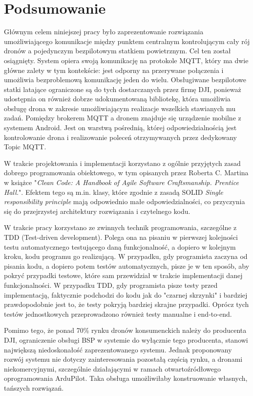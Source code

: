 \clearpage \section*{Podsumowanie} 

Głównym celem niniejszej pracy było zaprezentowanie rozwiązania umożliwiającego komunikacje między punktem centralnym kontrolującym cały rój dronów a pojedynczym bezpilotowym statkiem powietrznym. Cel ten został osiągnięty. System opiera swoją komunikację na protokole MQTT, który ma dwie główne zalety w tym kontekście: jest odporny na przerywane połączenia i umożliwia bezproblemową komunikację jeden do wielu. Obsługiwane bezpilotowe statki latające ograniczone są do tych dostarczanych przez firmę DJI, ponieważ udostępnia on również dobrze udokumentowaną bibliotekę, która umożliwia obsługę drona w zakresie umożliwiającym realizacje wszelkich stawianych mu zadań. Pomiędzy brokerem MQTT a dronem znajduje się urządzenie mobilne z systemem Android. Jest on warstwą pośrednią, której odpowiedzialnością jest kontrolowanie drona i realizowanie poleceń otrzymywanych przez dedykowany Topic MQTT.

W trakcie projektowania i implementacji korzystano z ogólnie przyjętych zasad dobrego programowania obiektowego, w tym opisanych przez Roberta C. Martina w książce "\textit{Clean Code: A Handbook of Agile Software Craftsmanship. Prentice Hall.}". Efektem tego są m.in. klasy, które zgodnie z zasadą SOLID \textit{Single responsibility principle} mają odpowiednio małe odpowiedzialności, co przyczynia się do przejrzystej architektury rozwiązania i czytelnego kodu. \cite{solid}\cite{clean-code}

W trakcie pracy korzystano ze zwinnych technik programowania, szczególne z TDD (Test-driven development). Polega ona na pisaniu w pierwszej kolejności testu automatycznego testującego daną funkcjonalność, a dopiero w kolejnym kroku, kodu programu go realizującą. W przypadku, gdy programista zaczyna od pisania kodu, a dopiero potem testów automatycznych, pisze je w ten sposób, aby pokryć przypadki testowe, które sam przewidział w trakcie implementacji danej funkcjonalności. W przypadku TDD, gdy programista pisze testy przed implementacją, faktycznie podchodzi do kodu jak do "czarnej skrzynki" i bardziej prawdopodobnie jest to, że testy pokryją bardziej skrajne przypadki. Oprócz tych testów jednostkowych przeprowadzono również testy manualne i end-to-end.

Pomimo tego, że ponad 70\% rynku dronów konsumenckich należy do producenta DJI, ograniczenie obsługi BSP w systemie do wyłącznie tego producenta, stanowi największą niedoskonałość zaprezentowanego systemu. Jednak proponowany rozwój systemu nie dotyczy zainteresowania pozostałą częścią rynku, a dronami niekomercyjnymi, szczególnie działającymi w ramach otwartoźródłowego oprogramowania ArduPilot. Taka obsługa umożliwiłaby konstruowanie własnych, tańszych rozwiązań.

